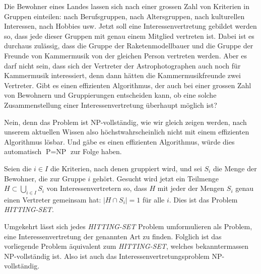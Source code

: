 Die Bewohner eines Landes lassen sich nach einer grossen Zahl
von Kriterien in Gruppen einteilen: nach Berufsgruppen, nach
Altersgruppen, nach kulturellen Interessen, nach Hobbies usw.
Jetzt soll eine Interessenvertretung gebildet werden so, dass
jede dieser Gruppen mit genau einem Mitglied vertreten ist.
Dabei ist es durchaus zulässig, dass die Gruppe der Raketenmodellbauer
und die Gruppe der Freunde von Kammermusik von der gleichen Person
vertreten werden. Aber es darf nicht sein, dass sich der Vertreter
der Astrophotographen auch noch für Kammermusik interessiert, denn
dann hätten die Kammermusikfreunde zwei Vertreter.
Gibt es einen effizienten Algorithmus, der auch bei einer grossen
Zahl von Bewohnern und Gruppierungen entscheiden kann, ob eine
solche Zusammenstellung einer Interessenvertretung überhaupt
möglich ist?

\begin{loesung}
Nein, denn das Problem ist NP-vollständig, wie wir gleich
zeigen werden, nach unserem aktuellen
Wissen also höchstwahrscheinlich nicht mit einem effizienten
Algorithmus lösbar. Und gäbe es einen effizienten Algorithmus,
würde dies automatisch $\text{P}=\text{NP}$ zur Folge haben.

Seien die $i\in I$ die Kriterien, nach denen gruppiert wird,
und sei $S_i$ die Menge der Bewohner, die zur Gruppe $i$ gehört.
Gesucht wird jetzt ein Teilmenge $H\subset\bigcup_{i\in I}S_i$
von Interessenvertretern so, dass $H$ mit jeder der Mengen
$S_i$ genau einen Vertreter gemeinsam hat: $|H\cap S_i|=1$
für alle $i$. Dies ist das Problem {\textsl{HITTING-SET}}. 

Umgekehrt lässt sich jedes {\textsl{HITTING-SET}} Problem umformulieren
als Problem, eine Interessenvertretung der genannten Art zu finden.
Folglich ist das vorliegende Problem äquivalent zum {\textsl{HITTING-SET}},
welches bekanntermassen NP-vollständig ist. Also ist auch das
Interessenvertretungsproblem NP-vollständig.
\end{loesung}
